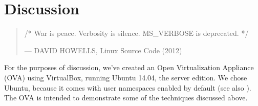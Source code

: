 
\chapter{Discussion}

\label{section:discussion}

\begin{quotation}

\footnotesize\sffamily\itshape

\begin{flushright}

/* War is peace. Verbosity is silence. MS\_VERBOSE is deprecated. */

\smallbreak

\upshape

--- DAVID HOWELLS, Linux Source Code (2012)

\end{flushright}

\end{quotation}



For the purposes of discussion, we've created an Open Virtualization Appliance
(OVA) using VirtualBox, running Ubuntu 14.04, the server edition. We chose
Ubuntu, because it comes with user namespaces enabled by default (see also
). The OVA is intended to
demonstrate some of the techniques discussed above.




